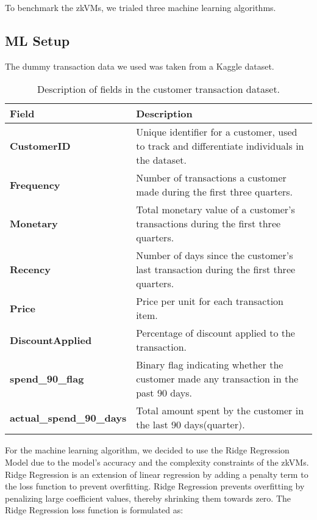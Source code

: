 \documentclass{scrartcl}
\begin{document}
To benchmark the zkVMs, we trialed three machine learning algorithms.

\subsection{ML Setup}

The dummy transaction data we used was taken from a Kaggle dataset\cite{rehman2023retail}. %

\begin{table}[h!]
\centering
\begin{tabular}{|l|p{10cm}|}
\hline
\textbf{Field} & \textbf{Description} \\
\hline
\textbf{CustomerID} & Unique identifier for a customer, used to track and differentiate individuals in the dataset. \\
\hline
\textbf{Frequency} & Number of transactions a customer made during the first three quarters. \\
\hline
\textbf{Monetary} & Total monetary value of a customer's transactions during the first three quarters. \\
\hline
\textbf{Recency} & Number of days since the customer's last transaction during the first three quarters. \\
\hline
\textbf{Price} & Price per unit for each transaction item. \\
\hline
\textbf{DiscountApplied} & Percentage of discount applied to the transaction. \\
\hline
\textbf{spend\_90\_flag} & Binary flag indicating whether the customer made any transaction in the past 90 days. \\
\hline
\textbf{actual\_spend\_90\_days} & Total amount spent by the customer in the last 90 days(quarter). \\
\hline
\end{tabular}
\caption{Description of fields in the customer transaction dataset.}
\label{tab:dataset_description}
\end{table}

For the machine learning algorithm, we decided to use the Ridge Regression Model due to the model's accuracy and the complexity constraints of the zkVMs. Ridge Regression is an extension of linear regression by adding a penalty term to the loss function to prevent overfitting.  Ridge Regression prevents overfitting by penalizing large coefficient values, thereby shrinking them towards zero. The Ridge Regression loss function is formulated as:
\end{document}
